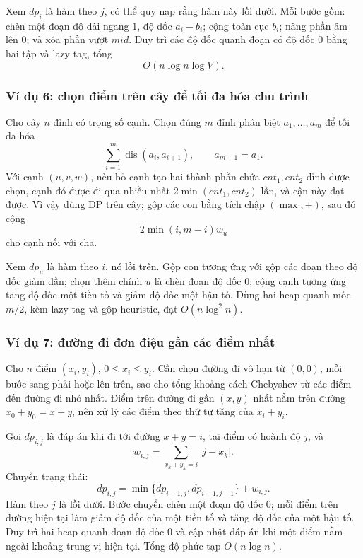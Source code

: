 \documentclass[11pt]{article}
\begin{document}
Xem \(dp_i\) là hàm theo \(j\), có thể quy nạp rằng hàm này lồi dưới. Mỗi bước
gồm: chèn một đoạn độ dài ngang \(1\), độ dốc \(a_i-b_i\); cộng toàn cục
\(b_i\); nâng phần âm lên \(0\); và xóa phần vượt \(mid\). Duy trì các độ dốc
quanh đoạn có độ dốc \(0\) bằng hai tập và lazy tag, tổng
\[
  O(n\log n\log V).
\]

\subsubsection{Ví dụ 6: chọn điểm trên cây để tối đa hóa chu trình}

Cho cây \(n\) đỉnh có trọng số cạnh. Chọn đúng \(m\) đỉnh phân biệt
\(a_1,\ldots,a_m\) để tối đa hóa
\[
  \sum_{i=1}^m \operatorname{dis}(a_i,a_{i+1}),\qquad a_{m+1}=a_1.
\]
Với cạnh \((u,v,w)\), nếu bỏ cạnh tạo hai thành phần chứa \(cnt_1,cnt_2\) đỉnh
được chọn, cạnh đó được đi qua nhiều nhất \(2\min(cnt_1,cnt_2)\) lần, và cận
này đạt được. Vì vậy dùng DP trên cây; gộp các con bằng tích chập
\((\max,+)\), sau đó cộng
\[
  2\min(i,m-i)w_u
\]
cho cạnh nối với cha.

Xem \(dp_u\) là hàm theo \(i\), nó lồi trên. Gộp con tương ứng với gộp các đoạn
theo độ dốc giảm dần; chọn thêm chính \(u\) là chèn đoạn độ dốc \(0\); cộng
cạnh tương ứng tăng độ dốc một tiền tố và giảm độ dốc một hậu tố. Dùng hai
heap quanh mốc \(m/2\), kèm lazy tag và gộp heuristic, đạt \(O(n\log^2 n)\).

\subsubsection{Ví dụ 7: đường đi đơn điệu gần các điểm nhất}

Cho \(n\) điểm \((x_i,y_i)\), \(0\le x_i\le y_i\). Cần chọn đường đi vô hạn từ
\((0,0)\), mỗi bước sang phải hoặc lên trên, sao cho tổng khoảng cách
Chebyshev từ các điểm đến đường đi nhỏ nhất. Điểm trên đường đi gần
\((x,y)\) nhất nằm trên đường \(x_0+y_0=x+y\), nên xử lý các điểm theo thứ tự
tăng của \(x_i+y_i\).

Gọi \(dp_{i,j}\) là đáp án khi đi tới đường \(x+y=i\), tại điểm có hoành độ
\(j\), và
\[
  w_{i,j}=\sum_{x_k+y_k=i}|j-x_k|.
\]
Chuyển trạng thái:
\[
  dp_{i,j}=\min\{dp_{i-1,j},dp_{i-1,j-1}\}+w_{i,j}.
\]
Hàm theo \(j\) là lồi dưới. Bước chuyển chèn một đoạn độ dốc \(0\); mỗi điểm
trên đường hiện tại làm giảm độ dốc của một tiền tố và tăng độ dốc của một hậu
tố. Duy trì hai heap quanh đoạn độ dốc \(0\) và cập nhật đáp án khi một điểm
nằm ngoài khoảng trung vị hiện tại. Tổng độ phức tạp \(O(n\log n)\).
\end{document}
